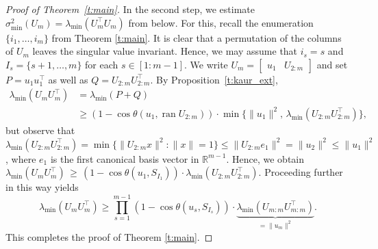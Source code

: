 \documentclass[a4paper, reqno]{amsart}
\newcommand{\R}{\ensuremath{\mathbb R}}
\begin{document}
\begin{proof}[Proof of Theorem~\ref{t:main}]
In the second step, we estimate $\sigma_\mathrm{min}^2(U_m) = \lambda_{\min}(U_m^\top U_m)$ from below. For this, recall the enumeration $\{i_1,\ldots,i_m\}$ from Theorem \ref{t:main}. It is clear that a permutation of the columns of $U_m$ leaves the singular value invariant. Hence, we may assume that $i_s = s$ and $I_s = \{s+1,\ldots,m\}$ for each $s\in [1:m-1]$. We write $U_m = \begin{bmatrix}u_1 & U_{2:m}\end{bmatrix}$ and set $P = u_1u_1^\top$ as well as $Q = U_{2:m}U_{2:m}^\top$. By Proposition~\ref{t:kaur_ext},
\begin{equation*}
        \begin{split}
        \lambda_{\min}(U_mU_m^\top) &= \lambda_{\min}(P+Q)\\
        &\geq (1 - \cos\theta(u_1,\operatorname{ran}U_{2:m}))\cdot\min\big\{\|u_1\|^2,\,\lambda_{\min}(U_{2:m}U_{2:m}^\top)\big\},
        \end{split}
\end{equation*}
but observe that $\lambda_{\min}(U_{2:m}U_{2:m}^\top) = \min\{\|U_{2:m}x\|^2 : \|x\|=1\}\le \|U_{2:m}e_1\|^2 = \|u_2\|^2\le\|u_1\|^2$, where $e_1$ is the first canonical basis vector in $\R^{m-1}$. Hence, we obtain $\lambda_{\min}(U_mU_m^\top)\,\ge\,(1 - \cos\theta(u_1,S_{I_1}))\cdot\lambda_{\min}(U_{2:m}U_{2:m}^\top)$. 
Proceeding further in this way yields
\begin{equation*}
        \lambda_{\min}(U_mU_m^\top) \geq \prod_{s=1}^{m-1}(1 - \cos\theta(u_s,S_{I_s})) \cdot \underbrace{\lambda_{\min}(U_{m:m}U_{m:m}^\top)}_{= \|u_m\|^2}.
\end{equation*}
This completes the proof of Theorem \ref{t:main}.
\end{proof}
\end{document}
